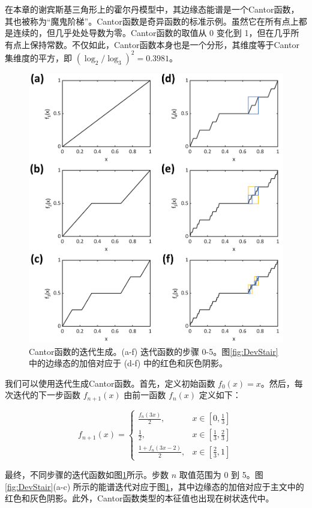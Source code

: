 在本章的谢宾斯基三角形上的霍尔丹模型中，其边缘态能谱是一个Cantor函数，其也被称为“魔鬼阶梯”。Cantor函数是奇异函数的标准示例。虽然它在所有点上都是连续的，但几乎处处导数为零。Cantor函数的取值从 0 变化到 1，但在几乎所有点上保持常数。不仅如此，Cantor函数本身也是一个分形，其维度等于Cantor集维度的平方\cite{darst1993hausdorff}，即 $(\log_2/\log_3)^2 = 0.3981$。
\begin{figure}[htbp]
    \centering
    \includegraphics[width=0.75\linewidth]{figure/FracHaldTheo/CantorFunc.jpg}
    \caption{Cantor函数的迭代生成。(a-f) 迭代函数的步骤 0-5。图\ref{fig:DevStair}中的边缘态的加倍对应于 (d-f) 中的红色和灰色阴影。}
    \label{fig:CantorFunc}
\end{figure}
我们可以使用迭代生成Cantor函数\cite{dovgoshey2006cantor}。首先，定义初始函数 $f_0(x) = x$。然后，每次迭代的下一步函数 $f_{n+1}(x)$ 由前一函数 $f_n(x)$ 定义如下：

\begin{equation}
f_{n+1}(x) =
\begin{cases}
\frac{f_n(3x)}{2}, & x \in \left[0, \frac{1}{3}\right] \\
\frac{1}{2}, & x \in \left[\frac{1}{3}, \frac{2}{3}\right] \\
\frac{1 + f_n(3x - 2)}{2}, & x \in \left[\frac{2}{3}, 1\right]
\end{cases}
\end{equation}

最终，不同步骤的迭代函数如图\ref{fig:CantorFunc}所示。步数 $n$ 取值范围为 0 到 5。图\ref{fig:DevStair}(a-c) 所示的能谱迭代对应于图\ref{fig:CantorFunc}，其中边缘态的加倍对应于主文中的红色和灰色阴影。此外，Cantor函数类型的本征值也出现在树状迭代中\cite{he2003trees}。

